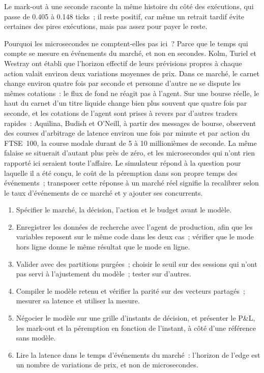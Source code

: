 Le mark-out à une seconde raconte la même histoire du côté des exécutions, qui passe de 0.405 à 0.148 ticks~; il reste positif, car
même un retrait tardif évite certaines des pires exécutions, mais pas assez pour payer le reste.

Pourquoi les microsecondes ne comptent-elles pas ici~? Parce que le temps qui compte se mesure en événements du marché, et non en secondes. Kolm,
Turiel et Westray ont établi que l'horizon effectif de leurs prévisions propres à chaque action valait environ deux variations moyennes de prix. Dans ce
marché, le carnet change environ quatre fois par seconde et personne d'autre ne se dispute les mêmes cotations~: le flux de fond
ne réagit pas à l'agent. Sur une bourse réelle, le haut du carnet d'un titre liquide change bien plus souvent que quatre fois par seconde, et les cotations de l'agent sont
prises à revers par d'autres traders rapides~: Aquilina, Budish et O'Neill, à partir des messages de bourse, observent des courses d'arbitrage de latence environ
une fois par minute et par action du FTSE~100, la course modale durant de 5 à 10 millionièmes de seconde. La même falaise se situerait
d'autant plus près de zéro, et les microsecondes qui n'ont rien rapporté ici seraient toute l'affaire. Le simulateur
répond à la question pour laquelle il a été conçu, le coût de la péremption dans son propre temps des événements~; transposer cette réponse à un marché réel
signifie la recalibrer selon le taux d'événements de ce marché et y ajouter ses concurrents.

\begin{method}\label{met:ml:lob:method}
\begin{enumerate}
\item Spécifier le marché, la décision, l'action et le budget avant le modèle.
\item Enregistrer les données de recherche avec l'agent de production, afin que les variables reposent sur le même code dans les deux cas~; vérifier que le mode hors ligne donne le même résultat que le mode en ligne.
\item Valider avec des partitions purgées~; choisir le seuil sur des sessions qui n'ont pas servi à l'ajustement du modèle~; tester sur d'autres.
\item Compiler le modèle retenu et vérifier la parité sur des vecteurs partagés~; mesurer sa latence et utiliser la mesure.
\item Négocier le modèle sur une grille d'instants de décision, et présenter le P\&L, les mark-out et la péremption en fonction de l'instant, à côté d'une référence sans modèle.
\item Lire la latence dans le temps d'événements du marché~: l'horizon de l'edge est un nombre de variations de prix, et non de microsecondes.
\end{enumerate}
\end{method}


